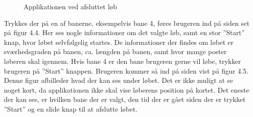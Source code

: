\begin{figure}
\begin{minipage}{.5\textwidth}
		\caption{Applikationen ved afsluttet løb}
		\label{fig:test2}
	\end{minipage}
\end{figure}

Trykkes der på en af banerne, eksempelvis bane 4, føres brugeren ind på siden set på figur 4.4. Her ses nogle informationer om det valgte løb, samt en stor ”Start” knap, hvor løbet selvfølgelig startes. De informationer der findes om løbet er sværhedsgraden på banen, ca. længden på banen, samt hvor mange poster løberen skal igennem. Hvis bane 4 er den bane brugeren gerne vil løbe, trykker brugeren på ”Start” knappen. Brugeren kommer så ind på siden vist på figur 4.5. Denne figur afbilleder hvad der kan ses under løbet. Det er ikke muligt at se noget kort, da applikationen ikke skal vise løberens position på kortet. Det eneste der kan ses, er hvilken bane der er valgt, den tid der er gået siden der er trykket ”Start” og en slide knap til at afslutte løbet.
